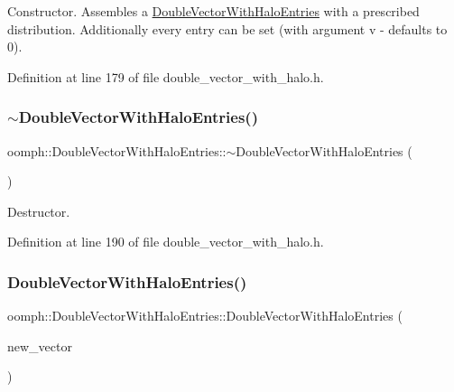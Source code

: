 Constructor. Assembles a \hyperlink{classoomph_1_1DoubleVectorWithHaloEntries}{Double\+Vector\+With\+Halo\+Entries} with a prescribed distribution. Additionally every entry can be set (with argument v -\/ defaults to 0). 



Definition at line 179 of file double\+\_\+vector\+\_\+with\+\_\+halo.\+h.

\mbox{\label{classoomph_1_1DoubleVectorWithHaloEntries_aff20c271cfabd18132df864d24ad5cbf}} 
\subsubsection{\texorpdfstring{$\sim$\+Double\+Vector\+With\+Halo\+Entries()}{~DoubleVectorWithHaloEntries()}}
{\footnotesize\ttfamily oomph\+::\+Double\+Vector\+With\+Halo\+Entries\+::$\sim$\+Double\+Vector\+With\+Halo\+Entries (\begin{DoxyParamCaption}{ }\end{DoxyParamCaption})\hspace{0.3cm}{\ttfamily [inline]}}



Destructor. 



Definition at line 190 of file double\+\_\+vector\+\_\+with\+\_\+halo.\+h.

\mbox{\label{classoomph_1_1DoubleVectorWithHaloEntries_a9bef4c069e52aa1aa394e8b0b75d3367}} 
\subsubsection{\texorpdfstring{Double\+Vector\+With\+Halo\+Entries()}{DoubleVectorWithHaloEntries()}\hspace{0.1cm}{\footnotesize\ttfamily [4/5]}}
{\footnotesize\ttfamily oomph\+::\+Double\+Vector\+With\+Halo\+Entries\+::\+Double\+Vector\+With\+Halo\+Entries (\begin{DoxyParamCaption}\item[{const \hyperlink{classoomph_1_1DoubleVectorWithHaloEntries}{Double\+Vector\+With\+Halo\+Entries} \&}]{new\+\_\+vector }\end{DoxyParamCaption})\hspace{0.3cm}{\ttfamily [inline]}}



